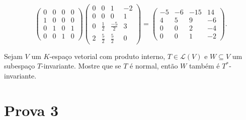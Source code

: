 \documentclass[11pt,a4paper]{article}
\begin{document}
{\[\begin{pmatrix}
0 & 0 & 0 & 0 \\
1 & 0 & 0 & 0 \\
0 & 1 & 0 & 1 \\
0 & 0 & 1 & 0
\end{pmatrix}\left(\begin{matrix}
0 & 0 & 1 & -2 \\
0 & 0 & 0 & 1 \\
0 & \frac{1}{2} & \frac{-5}{2} & 3 \\
2 & \frac{5}{2} & \frac{5}{2} & 0
\end{matrix}\right) = \begin{pmatrix}
-5 & -6 & -15 & 14 \\
4 & 5 & 9 & -6 \\
0 & 0 & 2 & -4 \\
0 & 0 & 1 & -2
\end{pmatrix}.
\]
}
\begin{exercicio}
Sejam $V$ um $K$-espaço vetorial com produto interno, $T \in \mathcal{L}(V)$ e $W \subseteq V$ um subespaço $T$-invariante. Mostre que se $T$ é normal, então $W$ também é $T^{*}$-invariante.
\end{exercicio}
\solucao{
}

\newpage
\section{\textcolor{Floresta}{Prova 3}}
\end{document}
